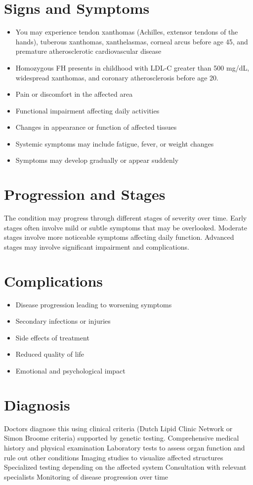 \section{Signs and Symptoms}
\begin{itemize}[noitemsep]
  \item You may experience tendon xanthomas (Achilles, extensor tendons of the hands), tuberous xanthomas, xanthelasmas, corneal arcus before age 45, and premature atherosclerotic cardiovascular disease
  \item Homozygous FH presents in childhood with LDL-C greater than 500 mg/dL, widespread xanthomas, and coronary atherosclerosis before age 20.
  \item Pain or discomfort in the affected area
  \item Functional impairment affecting daily activities
  \item Changes in appearance or function of affected tissues
  \item Systemic symptoms may include fatigue, fever, or weight changes
  \item Symptoms may develop gradually or appear suddenly
\end{itemize}
\section{Progression and Stages}
The condition may progress through different stages of severity over time. Early stages often involve mild or subtle symptoms that may be overlooked. Moderate stages involve more noticeable symptoms affecting daily function. Advanced stages may involve significant impairment and complications.
\section{Complications}
\begin{itemize}[noitemsep]
  \item Disease progression leading to worsening symptoms
  \item Secondary infections or injuries
  \item Side effects of treatment
  \item Reduced quality of life
  \item Emotional and psychological impact
\end{itemize}
\section{Diagnosis}
Doctors diagnose this using clinical criteria (Dutch Lipid Clinic Network or Simon Broome criteria) supported by genetic testing. Comprehensive medical history and physical examination Laboratory tests to assess organ function and rule out other conditions Imaging studies to visualize affected structures Specialized testing depending on the affected system Consultation with relevant specialists Monitoring of disease progression over time

